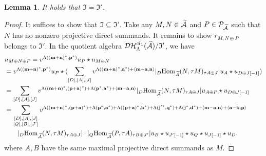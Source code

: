 \documentclass[reqno,12pt]{amsart}
\numberwithin{equation}{section}
\theoremstyle{plain} %
\newtheorem{lemma}[theorem]{\bf Lemma}
\theoremstyle{definition} %
\begin{document}
\begin{lemma}\label{lxdjkh}
It holds that $\mathfrak{I}=\mathfrak{I}'$.
\end{lemma}
\begin{proof}
It suffices to show that $\mathfrak{I}\subseteq \mathfrak{I}'$. Take any $M,N\in \widetilde{\mathcal{A}}$ and $P\in \mathcal{P}_{\widetilde{\mathcal{A}}}$ such that $N$ has no nonzero projective direct summands. It remains to show $r_{M,N\oplus P}$ belongs to $\mathfrak{I}'$. In the quotient algebra $\mathcal {D}\mathcal {H}_\Lambda^{{cl}_1}(\widetilde{\mathcal{A}})/\mathfrak{I}'$, we have
\begin{equation}\label{eq:MNP-decom}
\begin{split}
&u_{M\oplus N\oplus P}=v^{\Lambda((\mathbf{m}+\mathbf{n})^\ast, \mathbf{p}^\ast)} u_P\star u_{M\oplus N}\\
&=v^{\Lambda((\mathbf{m}+\mathbf{n})^\ast, \mathbf{p}^\ast)} u_P\star(\sum_{[D],[A],[J]}v^{\Lambda((\mathbf{m}+\mathbf{n})^\ast,\mathbf{a}^\ast)+\langle \mathbf{m}-\mathbf{a},\mathbf{n}\rangle}|_D\mbox{\rm Hom}_{\widetilde{\mathcal{A}}}(N,\tau M)_{\tau A\oplus J}|u_A\star u_{D\oplus J[-1]})\\
&=\sum_{[D],[A],[J]}v^{\Lambda((\mathbf{m}+\mathbf{n})^\ast,(\mathbf{p}+\mathbf{a})^\ast)+\Lambda(\mathbf{p}^\ast,\mathbf{a}^\ast)+\langle \mathbf{m}-\mathbf{a},\mathbf{n}\rangle}|_D\mbox{\rm Hom}_{\widetilde{\mathcal{A}}}(N,\tau M)_{\tau A\oplus J}|u_{A\oplus P}\star u_{D\oplus J[-1]}\\
&=\sum_{\substack{[D],[A],[J]\\ [Q],[B],[J']}}v^{\Lambda((\mathbf{m}+\mathbf{n})^\ast,(\mathbf{p}+\mathbf{a})^\ast)+\Lambda(\mathbf{p}^\ast,\mathbf{a}^\ast)+\Lambda((\mathbf{p}+\mathbf{a})^\ast,\mathbf{b}^\ast)+\Lambda(\mathbf{j'}^\ast,\mathbf{q}^\ast)+\Lambda(\mathbf{j}^\ast,\mathbf{d}^\ast)+\langle \mathbf{m}-\mathbf{a},\mathbf{n}\rangle+\langle\mathbf{a}-\mathbf{b},\mathbf{p}\rangle}\\
&\quad\quad |_D\mbox{\rm Hom}_{\widetilde{\mathcal{A}}}(N,\tau M)_{\tau A\oplus J}|\cdot |_Q\mbox{\rm Hom}_{\widetilde{\mathcal{A}}}(P,\tau A)_{\tau B\oplus J'}|u_B\star u_{J'[-1]}\star u_Q\star  u_{J[-1]}\star u_D,
\end{split}\end{equation}
where $A,B$ have the same maximal projective direct summands as $M$.


\end{proof}
\end{document}
